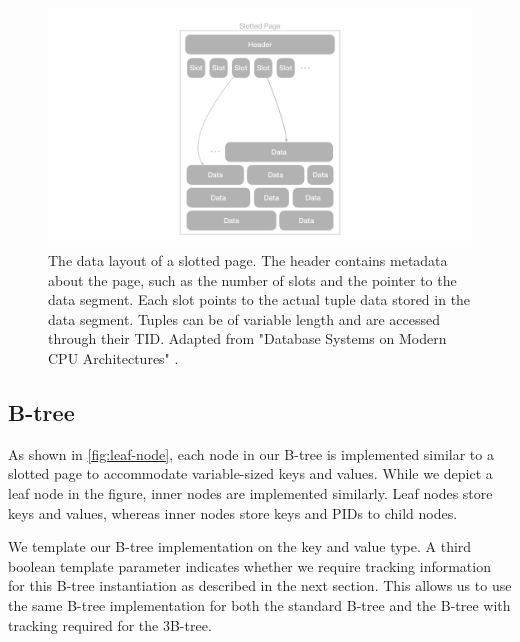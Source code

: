 \begin{figure}[htbp]
  \centering
  \includegraphics[width=1\textwidth]{figures/slotted_page.pdf}
  \caption{The data layout of a slotted page. The header contains metadata about the page, such as the number of slots and the pointer to the data segment. Each slot points to the actual tuple data stored in the data segment. Tuples can be of variable length and are accessed through their \ac{TID}. Adapted from "Database Systems on Modern CPU Architectures" \autocite{mdbs2024slides}.}
  \label{fig:slotted-page}
\end{figure}

\subsection*{B-tree}

As shown in \autoref{fig:leaf-node}, each node in our B-tree is implemented similar to a slotted page to accommodate variable-sized keys and values.
While we depict a leaf node in the figure, inner nodes are implemented similarly.
Leaf nodes store keys and values, whereas inner nodes store keys and \ac{PID}s to child nodes.

We template our B-tree implementation on the key and value type.
A third boolean template parameter indicates whether we require tracking information for this B-tree instantiation as described in the next section.
This allows us to use the same B-tree implementation for both the standard B-tree and the B-tree with tracking required for the 3B-tree.

